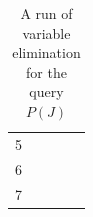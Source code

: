 \documentclass[12pt,a4paper]{article}
\begin{document}
\begin{table}[!h]
\begin{tabular}{c|l|l|l|l}
5    &                                                                                    &                                                                             &                                                                                   &                                                                          \\
6    &                                                                                    &                                                                             &                                                                                   &                                                                          \\
7    &                                                                                    &                                                                             &                                                                                   &                                                                         
\end{tabular}
\caption{A run of variable elimination for the query $P(J)$}
\label{table:VE}
\end{table}



\end{document}
